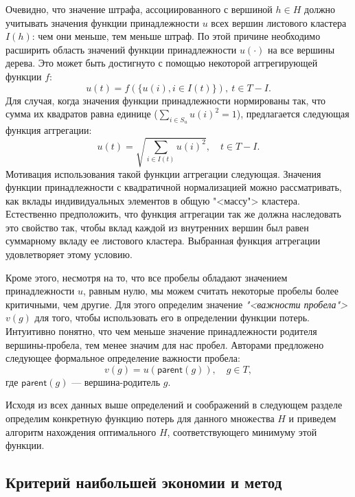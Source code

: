 \documentclass[12pt]{article}
\let\oldsubsection\subsection
\renewcommand{\subsection}{\clearpage\oldsubsection}
\begin{document}
Очевидно, что значение штрафа, ассоциированного с вершиной $h\in H$ должно учитывать значения функции принадлежности $u$ всех вершин листового кластера $I(h)$: чем они меньше, тем меньше штраф. По этой причине необходимо расширить область значений функции принадлежности $u(\cdot)$ на все вершины дерева. Это может быть достигнуто с помощью некоторой аггрегирующей функции $f$:
\begin{equation}
	u(t) = f(\{u(i),i\in I(t)\}), \ t\in T-I.
\end{equation}
Для случая, когда значения функции принадлежности нормированы так, что сумма их квадратов равна единице ($\sum_{i\in S_u}u(i)^2=1$), предлагается следующая функция аггрегации:
\begin{equation}
	u(t) = \sqrt{\sum_{i\in I(t)}u(i)^2}, \quad  t\in T-I.
	\label{eq:u_extend}
\end{equation} %
Мотивация использования такой функции аггрегации следующая. Значения функции принадлежности с квадратичной нормализацией можно рассматривать, как вклады индивидуальных элементов в общую "<массу"> кластера. Естественно предположить, что функция аггрегации так же должна наследовать это свойство так, чтобы вклад каждой из внутренних вершин был равен суммарному вкладу ее листового кластера. Выбранная функция аггрегации удовлетворяет этому условию.

Кроме этого, несмотря на то, что все пробелы обладают значением принадлежности $u$, равным нулю, мы можем считать некоторые пробелы более критичными, чем другие. Для этого определим значение \textit{"<важности пробела">} $v(g)$ для того, чтобы использовать его в определении функции потерь. Интуитивно понятно, что чем меньше значение принадлежности родителя вершины-пробела, тем менее значим для нас пробел. Авторами \cite{mirkin2018preprint} предложено следующее формальное определение важности пробела:
\begin{equation}
	v(g)=u(\textsf{parent}(g)), \quad g\in T,
	\label{eq:gap_importance}
\end{equation}
где $\textsf{parent}(g)$ --- вершина-родитель $g$.

Исходя из всех данных выше определений и соображений в следующем разделе определим конкретную функцию потерь для данного множества $H$ и приведем алгоритм нахождения оптимального $H$, соответствующего минимуму этой функции.


\subsection{Критерий наибольшей экономии и метод}
\end{document}
